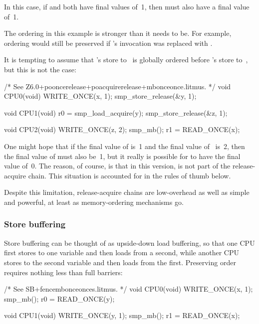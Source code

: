 In this case, if  and  both have final values of~1, then 
must also have a final value of~1.

The ordering in this example is stronger than it needs to be.
For example, ordering would still be preserved if 's
 invocation was replaced with .

It is tempting to assume that 's store to~ is globally ordered
before 's store to~, but this is not the case:

\begin{VerbatimU}
	/* See Z6.0+pooncerelease+poacquirerelease+mbonceonce.litmus. */
	void CPU0(void)
	{
		WRITE_ONCE(x, 1);
		smp_store_release(&y, 1);
	}

	void CPU1(void)
	{
		r0 = smp_load_acquire(y);
		smp_store_release(&z, 1);
	}

	void CPU2(void)
	{
		WRITE_ONCE(z, 2);
		smp_mb();
		r1 = READ_ONCE(x);
	}
\end{VerbatimU}

One might hope that if the final value of  is~1 and the final value
of~ is~2, then the final value of  must also be~1, but it
really is possible for  to have the final value of~0.
The reason, of course, is that in this version,  is not part
of the release-acquire chain.
This situation is accounted for in the rules of thumb below.

Despite this limitation, release-acquire chains are low-overhead as
well as simple and powerful, at least as memory-ordering mechanisms go.


\subsubsection{Store buffering}

Store buffering can be thought of as upside-down load buffering, so
that one CPU first stores to one variable and then loads from a second,
while another CPU stores to the second variable and then loads from the
first.
Preserving order requires nothing less than full barriers:

\begin{VerbatimU}
	/* See SB+fencembonceonces.litmus. */
	void CPU0(void)
	{
		WRITE_ONCE(x, 1);
		smp_mb();
		r0 = READ_ONCE(y);
	}

	void CPU1(void)
	{
		WRITE_ONCE(y, 1);
		smp_mb();
		r1 = READ_ONCE(x);
	}
\end{VerbatimU}

